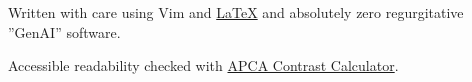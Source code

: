 \documentclass[lighthipster]{simplehipstercv}
\begin{document}
\begin{paracol}{2}
  \vfill{} %
  \vspace{26em}
  \vfill
  \begin{center}\fontfamily{\sfdefault}\selectfont \color{black!90}
    {
      \small
      Written with care using Vim and \href{https://github.com/izcet/latex-resume}{\LaTeX{}} and absolutely zero regurgitative ''GenAI'' software.

      Accessible readability checked with \href{http://www.myndex.com/APCA/}{APCA Contrast Calculator}.
    }
  \end{center}

  \vspace{4em}
\end{paracol}
\end{document}
